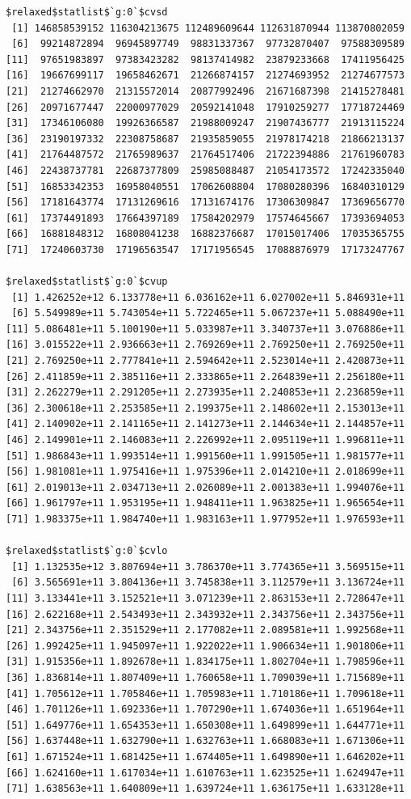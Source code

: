 \documentclass[
]{article}
\begin{document}
\begin{verbatim}
$relaxed$statlist$`g:0`$cvsd
 [1] 146858539152 116304213675 112489609644 112631870944 113870802059
 [6]  99214872894  96945897749  98831337367  97732870407  97588309589
[11]  97651983897  97383423282  98137414982  23879233668  17411956425
[16]  19667699117  19658462671  21266874157  21274693952  21274677573
[21]  21274662970  21315572014  20877992496  21671687398  21415278481
[26]  20971677447  22000977029  20592141048  17910259277  17718724469
[31]  17346106080  19926366587  21988009247  21907436777  21913115224
[36]  23190197332  22308758687  21935859055  21978174218  21866213137
[41]  21764487572  21765989637  21764517406  21722394886  21761960783
[46]  22438737781  22687377809  25985088487  21054173572  17242335040
[51]  16853342353  16958040551  17062608804  17080280396  16840310129
[56]  17181643774  17131269616  17131674176  17306309847  17369656770
[61]  17374491893  17664397189  17584202979  17574645667  17393694053
[66]  16881848312  16808041238  16882376687  17015017406  17035365755
[71]  17240603730  17196563547  17171956545  17088876979  17173247767

$relaxed$statlist$`g:0`$cvup
 [1] 1.426252e+12 6.133778e+11 6.036162e+11 6.027002e+11 5.846931e+11
 [6] 5.549989e+11 5.743054e+11 5.722465e+11 5.067237e+11 5.088490e+11
[11] 5.086481e+11 5.100190e+11 5.033987e+11 3.340737e+11 3.076886e+11
[16] 3.015522e+11 2.936663e+11 2.769269e+11 2.769250e+11 2.769250e+11
[21] 2.769250e+11 2.777841e+11 2.594642e+11 2.523014e+11 2.420873e+11
[26] 2.411859e+11 2.385116e+11 2.333865e+11 2.264839e+11 2.256180e+11
[31] 2.262279e+11 2.291205e+11 2.273935e+11 2.240853e+11 2.236859e+11
[36] 2.300618e+11 2.253585e+11 2.199375e+11 2.148602e+11 2.153013e+11
[41] 2.140902e+11 2.141165e+11 2.141273e+11 2.144634e+11 2.144857e+11
[46] 2.149901e+11 2.146083e+11 2.226992e+11 2.095119e+11 1.996811e+11
[51] 1.986843e+11 1.993514e+11 1.991560e+11 1.991505e+11 1.981577e+11
[56] 1.981081e+11 1.975416e+11 1.975396e+11 2.014210e+11 2.018699e+11
[61] 2.019013e+11 2.034713e+11 2.026089e+11 2.001383e+11 1.994076e+11
[66] 1.961797e+11 1.953195e+11 1.948411e+11 1.963825e+11 1.965654e+11
[71] 1.983375e+11 1.984740e+11 1.983163e+11 1.977952e+11 1.976593e+11

$relaxed$statlist$`g:0`$cvlo
 [1] 1.132535e+12 3.807694e+11 3.786370e+11 3.774365e+11 3.569515e+11
 [6] 3.565691e+11 3.804136e+11 3.745838e+11 3.112579e+11 3.136724e+11
[11] 3.133441e+11 3.152521e+11 3.071239e+11 2.863153e+11 2.728647e+11
[16] 2.622168e+11 2.543493e+11 2.343932e+11 2.343756e+11 2.343756e+11
[21] 2.343756e+11 2.351529e+11 2.177082e+11 2.089581e+11 1.992568e+11
[26] 1.992425e+11 1.945097e+11 1.922022e+11 1.906634e+11 1.901806e+11
[31] 1.915356e+11 1.892678e+11 1.834175e+11 1.802704e+11 1.798596e+11
[36] 1.836814e+11 1.807409e+11 1.760658e+11 1.709039e+11 1.715689e+11
[41] 1.705612e+11 1.705846e+11 1.705983e+11 1.710186e+11 1.709618e+11
[46] 1.701126e+11 1.692336e+11 1.707290e+11 1.674036e+11 1.651964e+11
[51] 1.649776e+11 1.654353e+11 1.650308e+11 1.649899e+11 1.644771e+11
[56] 1.637448e+11 1.632790e+11 1.632763e+11 1.668083e+11 1.671306e+11
[61] 1.671524e+11 1.681425e+11 1.674405e+11 1.649890e+11 1.646202e+11
[66] 1.624160e+11 1.617034e+11 1.610763e+11 1.623525e+11 1.624947e+11
[71] 1.638563e+11 1.640809e+11 1.639724e+11 1.636175e+11 1.633128e+11


\end{verbatim}
\end{document}
